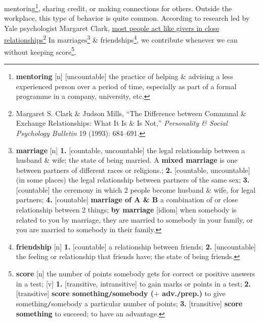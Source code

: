\documentclass[oneside]{book}
\numberwithin{equation}{section}
\begin{document}
mentoring\footnote{\textbf{mentoring} [n] [uncountable] the practice of helping \& advising a less experienced person over a period of time, especially as part of a formal programme in a company, university, etc.}, sharing credit, or making connections for others. Outside the workplace, this type of behavior is quite common. According to research led by Yale psychologist Margaret Clark, \underline{most people act like givers in close relationships}\footnote{Margaret S. Clark \& Judson Mills, ``The Difference between Communal \& Exchange Relationships: What It Is \& Is Not,'' \textit{Personality \& Social Psychology Bulletin} 19 (1993): 684--691.} In marriages\footnote{\textbf{marriage} [n] \textbf{1.} [countable, uncountable] the legal relationship between a husband \& wife; the state of being married. A \textbf{mixed marriage} is one between partners of different races or religions.; \textbf{2.} [countable, uncountable] (in some places) the legal relationship between partners of the same sex; \textbf{3.} [countable] the ceremony in which 2 people become husband \& wife, for legal partners; \textbf{4.} [countable] \textbf{marriage of A \& B} a combination of or close relationship between 2 things; \textbf{by marriage} [idiom] when somebody is related to you by marriage, they are married to somebody in your family, or you are married to somebody in their family.} \& friendships\footnote{\textbf{friendship} [n] \textbf{1.} [countable] a relationship between friends; \textbf{2.} [uncountable] the feeling or relationship that friends have; the state of being friends.}, we contribute whenever we can without keeping score\footnote{\textbf{score} [n] the number of points somebody gets for correct or positive answers in a test; [v] \textbf{1.} [transitive, intransitive] to gain marks or points in a test; \textbf{2.} [transitive] \textbf{score something\texttt{/}somebody ($+$ adv.\texttt{/}prep.)} to give something\texttt{/}somebody a particular number of points; \textbf{3.} [transitive] \textbf{score something} to succeed; to have an advantage.}.
\end{document}
